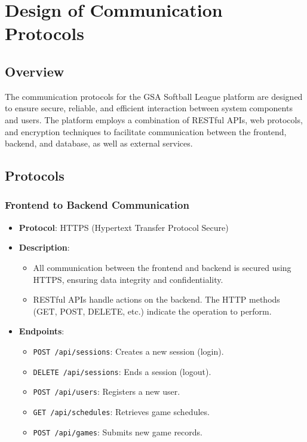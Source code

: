 \documentclass[12pt, titlepage]{article}
\begin{document}
\section{Design of Communication Protocols}

\subsection*{Overview}
The communication protocols for the GSA Softball League platform are designed to ensure secure, reliable, and efficient interaction between system components and users. The platform employs a combination of RESTful APIs, web protocols, and encryption techniques to facilitate communication between the frontend, backend, and database, as well as external services.

\subsection*{Protocols}

\subsubsection*{Frontend to Backend Communication}
\begin{itemize}
  \item \textbf{Protocol}: HTTPS (Hypertext Transfer Protocol Secure)
  \item \textbf{Description}:
  \begin{itemize}
      \item All communication between the frontend and backend is secured using HTTPS, ensuring data integrity and confidentiality.
      \item RESTful APIs handle actions on the backend. The HTTP methods (GET, POST, DELETE, etc.) indicate the operation to perform.
  \end{itemize}
  \item \textbf{Endpoints}:
  \begin{itemize}
      \item \texttt{POST /api/sessions}: Creates a new session (login).
      \item \texttt{DELETE /api/sessions}: Ends a session (logout).
      \item \texttt{POST /api/users}: Registers a new user.
      \item \texttt{GET /api/schedules}: Retrieves game schedules.
      \item \texttt{POST /api/games}: Submits new game records.
  \end{itemize}
\end{itemize}
\end{document}
